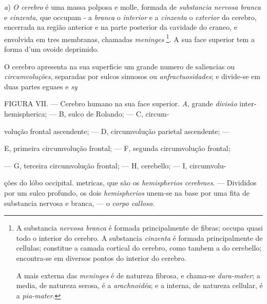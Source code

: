 \emph{a}) \emph{O cerebro} é uma massa polposa e molle, formada de \emph{substancia nervosa branca} e \emph{cinzenta}, que occupam - a \emph{branca} o \emph{interior} e a \emph{cinzenta} o \emph{exterior} do cerebro, encerrada na   região anterior e na parte posterior da cavidade do craneo, e envolvida em tres membranas, chamadas \emph{meninges} \footnote{A substancia \emph{nervosa branca} é formada principalmente de fibras; occupa quasi todo o interior do cerebro. A substancia \emph{cinzenta} é formada principalmente de cellulas; constitue a camada cortical do cerebro, como tambem a do cerebello; encontra-se em diversos pontos do interior do cerebro.\par A mais externa das \emph{meninges} é de natureza fibrosa, e chama-se \emph{dura-mater}; a media, de natureza serosa, é a \emph{arachnoidéa}; e a interna, de natureza cellular, é a \emph{pia-mater}.}. A sua face superior tem a forma d'um ovoide deprimido.

O cerebro apresenta na sua superficie um grande numero de saliencias ou \emph{circumvoluções}, separadas por sulcos sinuosos ou \emph{anfractuosidades}; e divide-se em duas partes eguaes e \emph{sy}

FIGURA VII. --- Cerebro humano na sua face superior. \emph{A}, grande \emph{divisão} inter-hemispherica; --- B, sulco de Rolando; --- C, circum-

volução frontal ascendente; --- D, circumvolução parietal ascendente; ---

E, primeira circumvolução frontal; --- F, segunda circumvolução frontal;

--- G, terceira circumvolução frontal; --- H, cerebello; --- I, circumvolu-

ções do lóbo occipital. metricas, que são os \emph{hemispherios cerebraes}. --- Divididos por um sulco profundo, os dois \emph{hemispherios} unem-se na base por uma fita de substancia nervosa e branca, --- o \emph{corpo calloso}.

